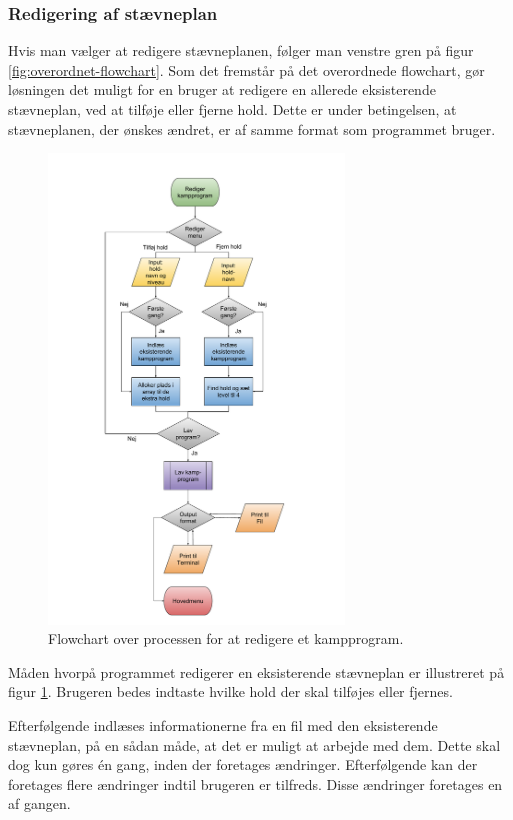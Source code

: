 \subsubsection{Redigering af stævneplan}
Hvis man vælger at redigere stævneplanen, følger man venstre gren på figur \ref{fig:overordnet-flowchart}. Som det fremstår på det overordnede flowchart, gør løsningen det muligt for en bruger at redigere en allerede eksisterende stævneplan, ved at tilføje eller fjerne hold. Dette er under betingelsen, at stævneplanen, der ønskes ændret, er af samme format som programmet bruger. 
\begin{figure}[H]
  \centering
  \includegraphics[width=0.7\textwidth]{figures/Redigerflowchart.pdf}
  \caption{Flowchart over processen for at redigere et kampprogram.}
  \label{fig:rediger-flowchart}
\end{figure}
Måden hvorpå programmet redigerer en eksisterende stævneplan er illustreret på figur \ref{fig:rediger-flowchart}. Brugeren bedes indtaste hvilke hold der skal tilføjes eller fjernes. 
\par
Efterfølgende indlæses informationerne fra en fil med den eksisterende stævneplan, på en sådan måde, at det er muligt at arbejde med dem. Dette skal dog kun gøres én gang, inden der foretages ændringer. Efterfølgende kan der foretages flere ændringer indtil brugeren er tilfreds. Disse ændringer foretages en af gangen. 

